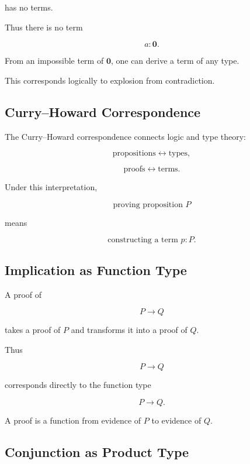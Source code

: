 has no terms.

Thus there is no term

\[
\boxed{
a:\mathbf{0}.
}
\]

From an impossible term of \(\mathbf{0}\), one can derive a term of any
type.

This corresponds logically to explosion from contradiction.

\subsection{Curry--Howard Correspondence}
\label{subsec:type-theory-curry-howard}

The Curry--Howard correspondence connects logic and type theory:

\[
\boxed{
\text{propositions}
\leftrightarrow
\text{types},
}
\]

\[
\boxed{
\text{proofs}
\leftrightarrow
\text{terms}.
}
\]

Under this interpretation,

\[
\boxed{
\text{proving proposition }P
}
\]

means

\[
\boxed{
\text{constructing a term }p:P.
}
\]

\subsection{Implication as Function Type}
\label{subsec:type-theory-implication}

A proof of

\[
P\rightarrow Q
\]

takes a proof of \(P\) and transforms it into a proof of \(Q\).

Thus

\[
\boxed{
P\rightarrow Q
}
\]

corresponds directly to the function type

\[
\boxed{
P\to Q.
}
\]

A proof is a function from evidence of \(P\) to evidence of \(Q\).

\subsection{Conjunction as Product Type}
\label{subsec:type-theory-conjunction}

